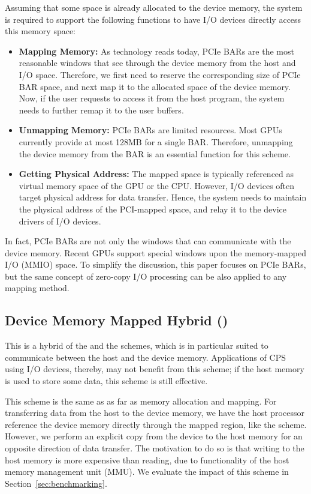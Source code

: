 Assuming that some space is already allocated to the device
memory, the system is required to support the following functions to have I/O
devices directly access this memory space:

\begin{itemize}
 \item \textbf{Mapping Memory:}
       As technology reads today, PCIe BARs are the most reasonable
       windows that see through the device memory from the host and I/O
       space.
       Therefore, we first need to reserve the corresponding size of
       PCIe BAR space, and next map it to the allocated space of the
       device memory.
       Now, if the user requests to access it from the host program, the
       system needs to further remap it to the user buffers.
 \item \textbf{Unmapping Memory:}
       PCIe BARs are limited resources. Most GPUs currently provide at
       most 128MB for a single BAR.
       Therefore, unmapping the device memory from the BAR is an essential
       function for this scheme.
 \item \textbf{Getting Physical Address:}
       The mapped space is typically referenced as virtual memory space
       of the GPU or the CPU.
       However, I/O devices often target physical address for data transfer.
       Hence, the system needs to maintain the physical address of the
       PCI-mapped space, and relay it to the device drivers of I/O devices.
\end{itemize}

In fact, PCIe BARs are not only the windows that can communicate with
the device memory.
Recent GPUs support special windows upon the memory-mapped I/O (MMIO) space.
To simplify the discussion, this paper focuses on PCIe BARs, but the
same concept of zero-copy I/O processing can be also applied to any
mapping method.

\subsection{Device Memory Mapped Hybrid ({\dmh})}
\label{sec:dmh}

This is a hybrid of the {\dm} and the {\hd} schemes, which is in
particular suited to communicate between the host and the device
memory.
Applications of CPS using I/O devices, thereby, may not benefit from
this scheme; if the host memory is used to store some data, this scheme
is still effective.

This scheme is the same as {\dm} as far as memory allocation
and mapping.
For transferring data from the host to the device memory, we have the
host processor reference the device memory directly through the
mapped region, like the {\dm} scheme.
However, we perform an explicit copy from the device to the host memory
for an opposite direction of data transfer.
The motivation to do so is that writing to the host memory is more
expensive than reading, due to functionality of the host memory
management unit (MMU).
We evaluate the impact of this scheme in Section~\ref{sec:benchmarking}.
